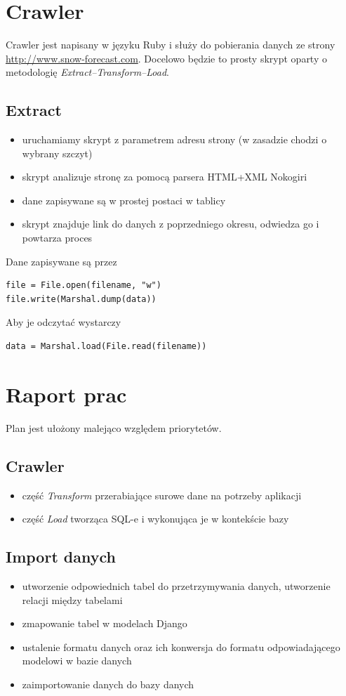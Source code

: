 \documentclass[12pt]{article}
\begin{document}
\newpage

\section{Crawler}
Crawler jest napisany w języku Ruby i służy do pobierania danych ze strony
\\\url{http://www.snow-forecast.com}.
Docelowo będzie to prosty skrypt oparty o metodologię \emph{Extract--Transform--Load}.
\subsection{Extract}
\begin{itemize}
\item uruchamiamy skrypt z parametrem adresu strony (w zasadzie chodzi o wybrany szczyt)
\item skrypt analizuje stronę za pomocą parsera HTML+XML Nokogiri
\item dane zapisywane są w prostej postaci w tablicy
\item skrypt znajduje link do danych z poprzedniego okresu, odwiedza go i powtarza proces
\end{itemize}
Dane zapisywane są przez
\begin{verbatim}
file = File.open(filename, "w")
file.write(Marshal.dump(data))
\end{verbatim}
Aby je odczytać wystarczy
\begin{verbatim}
data = Marshal.load(File.read(filename))
\end{verbatim}

\section{Raport prac}
Plan jest ułożony malejąco względem priorytetów.
\subsection{Crawler}
\begin{itemize}
  \item część \emph{Transform} przerabiające surowe dane na potrzeby aplikacji
  \item część \emph{Load} tworząca SQL-e i wykonująca je w kontekście bazy
\end{itemize}

\subsection{Import danych}
\begin{itemize}
  \item utworzenie odpowiednich tabel do przetrzymywania danych, utworzenie relacji między tabelami
  \item zmapowanie tabel w modelach Django
  \item ustalenie formatu danych oraz ich konwersja do formatu odpowiadającego modelowi w bazie danych
  \item zaimportowanie danych do bazy danych
\end{itemize}
\end{document}
